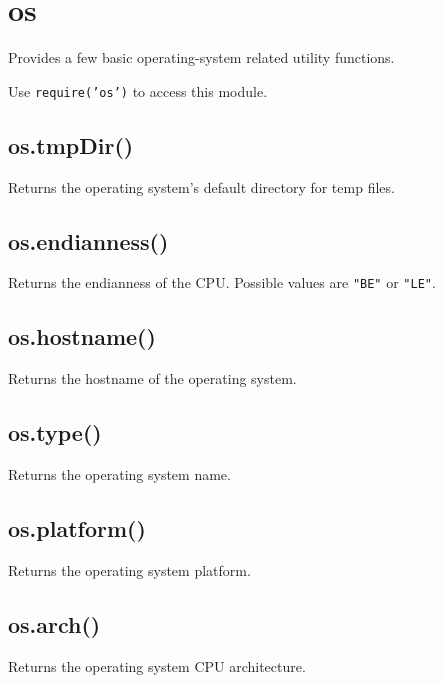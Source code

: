 \section{os}

\begin{Shaded}
\begin{Highlighting}[]
\NormalTok{: } 
\end{Highlighting}
\end{Shaded}

Provides a few basic operating-system related utility functions.

Use \texttt{require('os')} to access this module.

\subsection{os.tmpDir()}

Returns the operating system's default directory for temp files.

\subsection{os.endianness()}

Returns the endianness of the CPU. Possible values are \texttt{"BE"} or
\texttt{"LE"}.

\subsection{os.hostname()}

Returns the hostname of the operating system.

\subsection{os.type()}

Returns the operating system name.

\subsection{os.platform()}

Returns the operating system platform.

\subsection{os.arch()}

Returns the operating system CPU architecture.

